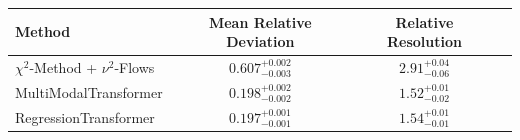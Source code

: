     \begin{tabular}{lccc}
        \toprule
        Method & Mean Relative Deviation & Relative Resolution \\
        \midrule
        $\chi^2$-Method + $\nu^2$-Flows & $0.607_{-0.003}^{+0.002}$ & $2.91_{-0.06}^{+0.04}$ \\
        MultiModalTransformer & $0.198_{-0.002}^{+0.002}$ & $1.52_{-0.02}^{+0.01}$ \\
        RegressionTransformer & $0.197_{-0.001}^{+0.001}$ & $1.54_{-0.01}^{+0.01}$ \\
        \bottomrule
    \end{tabular}
